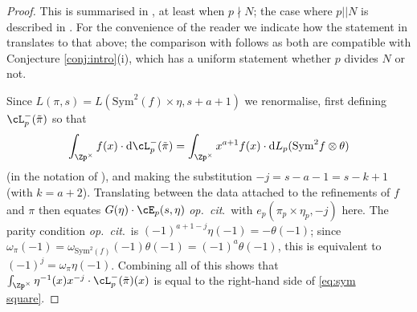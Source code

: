 \documentclass[10pt,reqno,a4paper]{amsart}
\begin{document}
\begin{proof}
This is summarised in \cite[Thm.\ 2.3.2(i)]{LZ-symmetric}, at least when $p\nmid N$; the case where $p||N$ is described in \cite{Ros16}. For the convenience of the reader we indicate how the statement in \cite{LZ-symmetric} translates to that above; the comparison with \cite{Ros16} follows as both are compatible with Conjecture \ref{conj:intro}(i), which has a uniform statement whether $p$ divides $N$ or not. 

Since $L(\pi,s) = L(\mathrm{Sym}^2(f)\times \eta,s+a+1)$ we renormalise, first defining $\cL_p^-(\tilde\pi)$ so that
\[
\int_{\Zp^\times} f(x) \cdot \mathrm{d}\cL_p^-(\tilde\pi) = \int_{\Zp^\times}x^{a+1}f(x)\cdot \mathrm{d}L_p(\mathrm{Sym}^2f \otimes \theta)
\]
(in the notation of \cite{LZ16}), and making the substitution $-j = s-a-1 = s-k+1$ (with $k = a+2$). Translating between the data attached to the refinements of $f$ and $\pi$ then equates $G(\eta) \cdot \cE_p(s,\eta)$ \emph{op.\ cit}.\ with $e_p(\pi_p \times \eta_p,-j)$ here.   The parity condition \emph{op.\ cit}.\ is $(-1)^{a+1-j}\eta(-1) = - \theta(-1)$; since $\omega_\pi(-1) = \omega_{\mathrm{Sym}^2(f)}(-1)\theta(-1) = (-1)^a\theta(-1)$, this is equivalent to $(-1)^j = \omega_\pi\eta(-1)$. Combining all of this shows that $\int_{\Zp^\times} \eta^{-1}(x)x^{-j} \cdot \cL_p^-(\tilde\pi)(x)$ is equal to the right-hand side of \eqref{eq:sym square}.
\end{proof}
\end{document}
